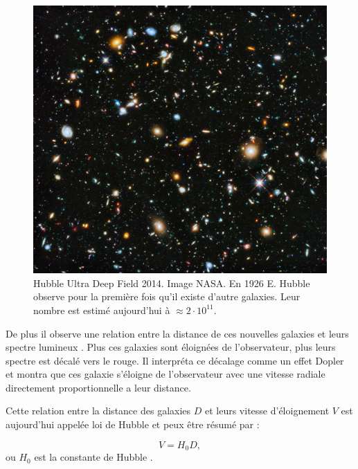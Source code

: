\begin{figure}[bth]
        \includegraphics[width=.9\linewidth]{img/01/hudf.jpeg} 
        \caption{Hubble Ultra Deep Field 2014.
        Image NASA.
		En 1926 E. Hubble observe pour la première fois qu'il existe d'autre galaxies.
		Leur nombre est estimé aujourd'hui à $\approx 2 \cdot 10^{11}$.}
 		\label{fig:hubbl_deep_field}
\end{figure}


De plus il observe une relation entre la distance de ces nouvelles galaxies et leurs spectre lumineux \citep{1929CoMtW...3...23H}.
Plus ces galaxies sont éloignées de l'observateur, plus leurs spectre est décalé vers le rouge.
Il interpréta ce décalage comme un effet Dopler et montra que ces galaxie s'éloigne de l'observateur avec une vitesse radiale directement proportionnelle a leur distance.

Cette relation entre la distance des galaxies $D$ et leurs vitesse d'éloignement $V$ est aujourd'hui appelée loi de Hubble et peux être résumé par :

\begin{equation}
V = H_0 D,
\end{equation}
ou $H_0$ est la constante de Hubble .

